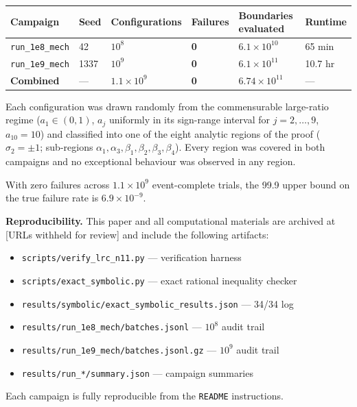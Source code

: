 \documentclass[12pt]{article}
\begin{document}
\begin{center}
\begin{tabular}{@{}llllll@{}}
\toprule
Campaign & Seed & Configurations & Failures & Boundaries evaluated & Runtime \\
\midrule
\texttt{run\_1e8\_mech} & 42 & $10^8$ & \textbf{0} & $6.1\times10^{10}$ & 65 min \\
\texttt{run\_1e9\_mech} & 1337 & $10^9$ & \textbf{0} & $6.1\times10^{11}$ & 10.7 hr \\
\textbf{Combined} & --- & $1.1\times10^9$ & \textbf{0} & $6.74\times10^{11}$ & --- \\
\bottomrule
\end{tabular}
\end{center}

Each configuration was drawn randomly from the commensurable large-ratio regime
($a_1\in(0,1)$, $a_j$ uniformly in its sign-range interval for $j=2,\ldots,9$,
$a_{10}=10$) and classified into one of the eight analytic regions of the proof
($\sigma_2=\pm1$; sub-regions $\alpha_1,\alpha_3,\beta_1,\beta_2,\beta_3,\beta_4$).
Every region was covered in both campaigns and no exceptional behaviour was observed
in any region.

With zero failures across $1.1\times10^9$ event-complete trials, the 99.9%
upper bound on the true failure rate is $6.9\times10^{-9}$.

\textbf{Reproducibility.}
This paper and all computational materials are archived at
[URLs withheld for review]
and include the following artifacts:

\begin{itemize}
\item \texttt{scripts/verify\_lrc\_n11.py} --- verification harness
\item \texttt{scripts/exact\_symbolic.py} --- exact rational inequality checker
\item \texttt{results/symbolic/exact\_symbolic\_results.json} --- 34/34 log
\item \texttt{results/run\_1e8\_mech/batches.jsonl} --- $10^8$ audit trail
\item \texttt{results/run\_1e9\_mech/batches.jsonl.gz} --- $10^9$ audit trail
\item \texttt{results/run\_*/summary.json} --- campaign summaries
\end{itemize}

Each campaign is fully reproducible from the \texttt{README} instructions.
\end{document}
